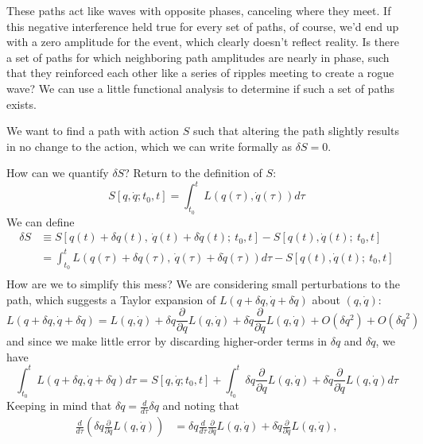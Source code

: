 \documentclass{amsart}
\newcommand{\md}{d}		%
\newcommand{\mderiv}[1]{\frac{\md}{\md {#1}}} %
\newcommand{\mpderiv}[1]{\frac{\partial}{\partial {#1}}} %
\newcommand{\qv}{q}
\newcommand{\action}[3]{S[#1,\dot{#1};#2,#3]}
\begin{document}
These paths act like waves with opposite phases, canceling where they meet.  If this negative interference held true for every set of paths, of course, we'd end up with a zero amplitude for the event, which clearly doesn't reflect reality.  Is there a set of paths for which neighboring path amplitudes are nearly in phase, such that they reinforced each other like a series of ripples meeting to create a rogue wave?  We can use a little functional analysis to determine if such a set of paths exists.

We want to find a path with action $S$ such that altering the path slightly results in no change to the action, which we can write formally as $\delta S = 0$.

How can we quantify $\delta S$?  Return to the definition of $S$:
\begin{equation*}
\action{\qv}{t_0}{t} = \int_{t_0}^{t} L(\qv(\tau),\dot{\qv}(\tau)) \md \tau
\end{equation*}
We can define
\begin{align*}
\delta S 
&\equiv S[\qv(t) + \delta \qv(t),\ \dot{\qv}(t) + \delta \dot{\qv}(t);\ t_0, t] - S[\qv(t), \dot{\qv}(t);\ t_0, t] \\
&= \int_{t_0}^{t} L(\qv(\tau) + \delta \qv(\tau),\ \dot{\qv}(\tau) + \delta \dot{\qv}(\tau)) \md \tau - S[\qv(t), \dot{\qv}(t);\ t_0, t] \\
\end{align*}
How are we to simplify this mess?  We are considering small perturbations to the path, which suggests a Taylor expansion of $L(\qv + \delta \qv,\dot{\qv} + \delta \dot{\qv})$ about $(\qv, \dot{\qv})$:
\begin{equation*}
L(\qv + \delta \qv,\dot{\qv} + \delta \dot{\qv}) = L(\qv,\dot{\qv}) + \delta \qv \mpderiv{\qv}L(\qv,\dot{\qv}) + \delta \dot{\qv} \mpderiv{\dot{\qv}}L(\qv,\dot{\qv}) + O(\delta \qv^2) + O(\delta \dot{\qv}^2)
\end{equation*}
and since we make little error by discarding higher-order terms in $\delta \qv$ and $\delta \dot{\qv}$, we have
\begin{equation*}
\int_{t_0}^{t} L(\qv + \delta \qv,\dot{\qv} + \delta \dot{\qv}) \md \tau 
= S[\qv, \dot{\qv}; t_0, t] + \int_{t_0}^{t} \delta \qv \mpderiv{\qv}L(\qv,\dot{\qv}) + \delta \dot{\qv} \mpderiv{\dot{\qv}}L(\qv,\dot{\qv}) \md \tau
\end{equation*}
Keeping in mind that $\delta \dot{\qv} = \mderiv{\tau}{\delta \qv}$ and noting that
\begin{align*}
\mderiv{\tau}{\left(\delta \qv \mpderiv{\dot{\qv}}L(\qv,\dot{\qv})\right)} &= \delta \qv \mderiv{\tau}{\mpderiv{\dot{\qv}}L(\qv,\dot{\qv})} + \delta \dot{\qv} \mpderiv{\dot{\qv}}L(\qv,\dot{\qv}),\\
\end{align*}
\end{document}
